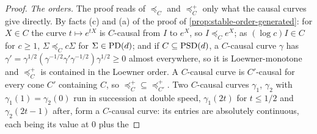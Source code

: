 \begin{proof}
\leanok
\emph{The orders.} The proof reads of $\preceq_C$ and $\preceq^+_C$ only what the causal
curves give directly. By facts (c) and (a) of the proof of \ref{prop:stable-order-generated}: for $X \in C$
the curve $t \mapsto e^{tX}$ is $C$-causal from $I$ to $e^X$, so $I \preceq_C e^X$; as $(\log c)I \in C$ for
$c \ge 1$, $\Sigma \preceq_C c\Sigma$ for $\Sigma \in \mathrm{PD}(d)$; and if $C \subseteq \mathrm{PSD}(d)$, a $C$-causal curve
$\gamma$ has $\gamma' = \gamma^{1/2}(\gamma^{-1/2}\gamma'\gamma^{-1/2})\gamma^{1/2} \ge 0$ almost everywhere, so
it is Loewner-monotone and $\preceq^+_C$ is contained in the Loewner order. A $C$-causal curve is
$C'$-causal for every cone $C'$ containing $C$, so $\preceq^+_C \subseteq \preceq^+_{C'}$. Two $C$-causal curves
$\gamma_1$, $\gamma_2$ with $\gamma_1(1) = \gamma_2(0)$ run in succession at double speed, $\gamma_1(2t)$ for
$t \le 1/2$ and $\gamma_2(2t-1)$ after, form a $C$-causal curve: its entries are absolutely continuous, each being its value at $0$ plus the

\end{proof}
